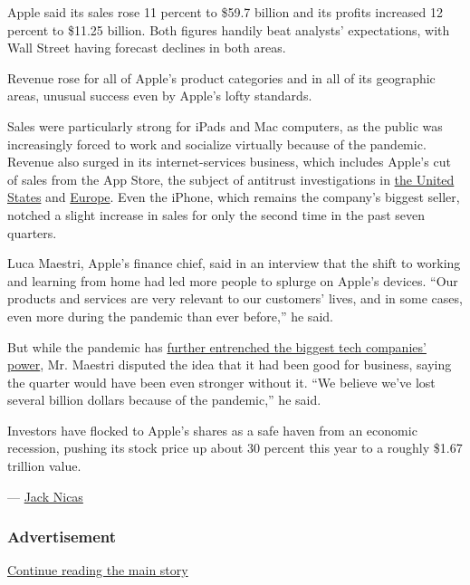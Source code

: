 Apple said its sales rose 11 percent to \$59.7 billion and its profits
increased 12 percent to \$11.25 billion. Both figures handily beat
analysts' expectations, with Wall Street having forecast declines in
both areas.

Revenue rose for all of Apple's product categories and in all of its
geographic areas, unusual success even by Apple's lofty standards.

Sales were particularly strong for iPads and Mac computers, as the
public was increasingly forced to work and socialize virtually because
of the pandemic. Revenue also surged in its internet-services business,
which includes Apple's cut of sales from the App Store, the subject of
antitrust investigations in
\href{https://www.nytimes.com/2020/07/28/technology/amazon-apple-facebook-google-antitrust-hearing.html}{the
United States} and
\href{https://www.nytimes.com/2020/06/16/business/apple-app-store-european-union-antitrust.html}{Europe}.
Even the iPhone, which remains the company's biggest seller, notched a
slight increase in sales for only the second time in the past seven
quarters.

Luca Maestri, Apple's finance chief, said in an interview that the shift
to working and learning from home had led more people to splurge on
Apple's devices. ``Our products and services are very relevant to our
customers' lives, and in some cases, even more during the pandemic than
ever before,'' he said.

But while the pandemic has
\href{https://www.nytimes.com/2020/03/23/technology/coronavirus-facebook-amazon-youtube.html}{further
entrenched the biggest tech companies' power}, Mr. Maestri disputed the
idea that it had been good for business, saying the quarter would have
been even stronger without it. ``We believe we've lost several billion
dollars because of the pandemic,'' he said.

Investors have flocked to Apple's shares as a safe haven from an
economic recession, pushing its stock price up about 30 percent this
year to a roughly \$1.67 trillion value.

--- \href{https://www.nytimes.com/by/jack-nicas}{Jack Nicas}

\hypertarget{advertisement-1}{%
\subsubsection{Advertisement}\label{advertisement-1}}

\protect\hyperlink{after-dfp-ad-mid2}{Continue reading the main story}

